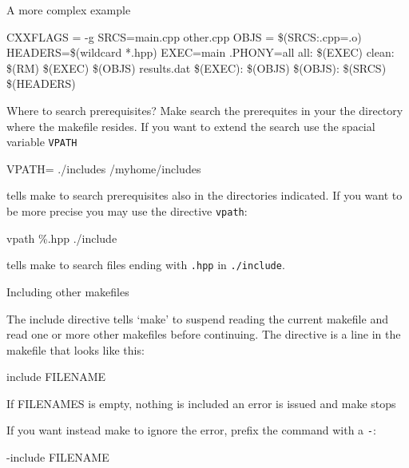 \documentclass[10pt,aspectratio=169]{beamer}
\begin{document}
\begin{frame}{A more complex example}
\begin{semiverbatim}
CXXFLAGS = -g\newline
SRCS=main.cpp other.cpp\newline
OBJS = \$(SRCS:.cpp=.o)\newline
HEADERS=\$(wildcard *.hpp)\newline
EXEC=main\newline
.PHONY=all\newline
all: \$(EXEC)\newline
clean:\newline
\phantom{xx} \$(RM) \$(EXEC) \$(OBJS) results.dat\newline
\$(EXEC): \$(OBJS)\newline
\$(OBJS): \$(SRCS) \$(HEADERS)
\end{semiverbatim}
\end{frame}

\begin{frame}{Where to search prerequisites?}
    Make search the prerequites in your the directory where the makefile resides.
    If you want to extend the search use the spacial variable \texttt{VPATH}
    
    \begin{semiverbatim}
        VPATH= ./includes /myhome/includes
    \end{semiverbatim}
    tells make to search prerequisites also in the directories indicated.
    If you want to be more precise you may use the directive \texttt{vpath}:
    \begin{semiverbatim}
        vpath \%.hpp ./include
    \end{semiverbatim}
    tells make to search files ending with \texttt{.hpp} in \texttt{./include}.
  \end{frame}

\begin{frame}{Including other makefiles} 
    
    The \alert{include} directive tells `make' to suspend reading the
    current makefile and read one or more other makefiles before
    continuing.  The directive is a line in the makefile that looks like
    this:
    
    \begin{semiverbatim}
        include FILENAME
    \end{semiverbatim}
    
    If FILENAMES is empty, nothing is included an error is issued and make stops
    
    If you want instead make to ignore the error, prefix the command with a
    \texttt{-}:
    \begin{semiverbatim}
        -include FILENAME
    \end{semiverbatim}
  \end{frame}
\end{document}
